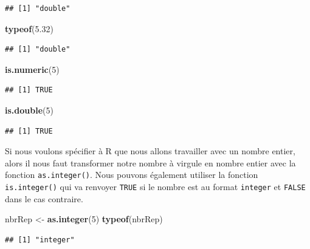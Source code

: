 \documentclass[
]{book}
\newenvironment{Shaded}{\begin{snugshade}}{\end{snugshade}}
\newcommand{\DecValTok}[1]{\textcolor[rgb]{0.00,0.00,0.81}{#1}}
\newcommand{\FloatTok}[1]{\textcolor[rgb]{0.00,0.00,0.81}{#1}}
\newcommand{\KeywordTok}[1]{\textcolor[rgb]{0.13,0.29,0.53}{\textbf{#1}}}
\newcommand{\NormalTok}[1]{#1}
\newcommand{\StringTok}[1]{\textcolor[rgb]{0.31,0.60,0.02}{#1}}
\begin{document}
\begin{verbatim}
## [1] "double"
\end{verbatim}

\begin{Shaded}
\begin{Highlighting}[]
\KeywordTok{typeof}\NormalTok{(}\FloatTok{5.32}\NormalTok{)}
\end{Highlighting}
\end{Shaded}

\begin{verbatim}
## [1] "double"
\end{verbatim}

\begin{Shaded}
\begin{Highlighting}[]
\KeywordTok{is.numeric}\NormalTok{(}\DecValTok{5}\NormalTok{)}
\end{Highlighting}
\end{Shaded}

\begin{verbatim}
## [1] TRUE
\end{verbatim}

\begin{Shaded}
\begin{Highlighting}[]
\KeywordTok{is.double}\NormalTok{(}\DecValTok{5}\NormalTok{)}
\end{Highlighting}
\end{Shaded}

\begin{verbatim}
## [1] TRUE
\end{verbatim}

Si nous voulons spécifier à R que nous allons travailler avec un nombre entier, alors il nous faut transformer notre nombre à virgule en nombre entier avec la fonction \texttt{as.integer()}. Nous pouvons également utiliser la fonction \texttt{is.integer()} qui va renvoyer \texttt{TRUE} si le nombre est au format \texttt{integer} et \texttt{FALSE} dans le cas contraire.

\begin{Shaded}
\begin{Highlighting}[]
\NormalTok{nbrRep <-}\StringTok{ }\KeywordTok{as.integer}\NormalTok{(}\DecValTok{5}\NormalTok{)}
\KeywordTok{typeof}\NormalTok{(nbrRep)}
\end{Highlighting}
\end{Shaded}

\begin{verbatim}
## [1] "integer"
\end{verbatim}
\end{document}
